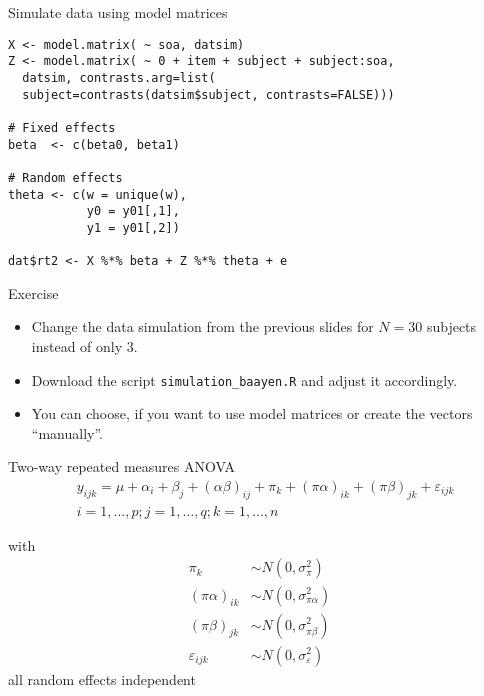 \documentclass{beamer}
\begin{document}
{

\begin{frame}[fragile]{Simulate data using model matrices}
  \begin{lstlisting}
X <- model.matrix( ~ soa, datsim)
Z <- model.matrix( ~ 0 + item + subject + subject:soa,
  datsim, contrasts.arg=list(
  subject=contrasts(datsim$subject, contrasts=FALSE)))

# Fixed effects
beta  <- c(beta0, beta1)

# Random effects
theta <- c(w = unique(w),
           y0 = y01[,1],
           y1 = y01[,2])

dat$rt2 <- X %*% beta + Z %*% theta + e
  \end{lstlisting}
\end{frame}

}

\begin{frame}[fragile]{}
  \begin{block}{Exercise}
    \begin{itemize}
      \item Change the data simulation from the previous slides for $N =
        30$ subjects instead of only 3.
      \item Download the script \verb+simulation_baayen.R+ and adjust it
        accordingly.
      \item You can choose, if you want to use model matrices or create
        the vectors ``manually''.
    \end{itemize}
  \end{block}
\end{frame}


\begin{frame}{Two-way repeated measures ANOVA}
  \begin{align*}
    &   y_{ijk} = \mu + \alpha_i + \beta_j + (\alpha\beta)_{ij} + \pi_k +
        (\pi\alpha)_{ik} + (\pi\beta)_{jk} + \varepsilon_{ijk}\\
    &  i = 1,\dots,p; j = 1,\dots,q; k = 1,\dots,n
  \end{align*}

     with
  \begin{align*}
    \pi_k & \sim N(0, \sigma^2_{\pi})\\
    (\pi\alpha)_{ik} & \sim N(0, \sigma^2_{\pi\alpha})\\
    (\pi\beta)_{jk} & \sim N(0, \sigma^2_{\pi\beta})\\
    \varepsilon_{ijk} & \sim N(0, \sigma^2_{\varepsilon})
  \end{align*}
     all random effects independent
\vfill
\end{frame}
\end{document}
